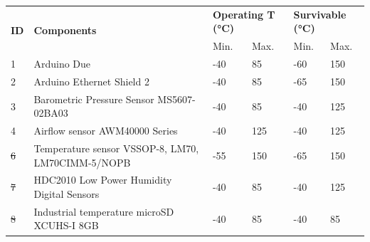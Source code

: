 \documentclass[a4paper,12pt,twoside]{article}
\providecommand{\DIFaddtex}[1]{{\protect\color{blue}\uwave{#1}}} %
\providecommand{\DIFdeltex}[1]{{\protect\color{red}\sout{#1}}}                      %
\providecommand{\DIFaddbegin}{} %
\providecommand{\DIFaddend}{} %
\providecommand{\DIFdelbegin}{} %
\providecommand{\DIFdelend}{} %
\providecommand{\DIFadd}[1]{\texorpdfstring{\DIFaddtex{#1}}{#1}} %
\providecommand{\DIFdel}[1]{\texorpdfstring{\DIFdeltex{#1}}{}} %
\newcommand{\DIFscaledelfig}{0.5}
\newlength{\DIFdelgraphicswidth} %
\newlength{\DIFdelgraphicsheight} %
\newcommand{\DIFaddincludegraphics}[2][]{{\color{blue}\fbox{\DIFOincludegraphics[#1]{#2}}}} %
\newcommand{\DIFdelincludegraphics}[2][]{%
\sbox{\DIFdelgraphicsbox}{\DIFOincludegraphics[#1]{#2}}%
\settoboxwidth{\DIFdelgraphicswidth}{\DIFdelgraphicsbox} %
\settoboxtotalheight{\DIFdelgraphicsheight}{\DIFdelgraphicsbox} %
\scalebox{\DIFscaledelfig}{%
\parbox[b]{\DIFdelgraphicswidth}{\usebox{\DIFdelgraphicsbox}\\[-\baselineskip] \rule{\DIFdelgraphicswidth}{0em}}\llap{\resizebox{\DIFdelgraphicswidth}{\DIFdelgraphicsheight}{%
\setlength{\unitlength}{\DIFdelgraphicswidth}%
\begin{picture}(1,1)%
\thicklines\linethickness{2pt} %
{\color[rgb]{1,0,0}\put(0,0){\framebox(1,1){}}}%
{\color[rgb]{1,0,0}\put(0,0){\line( 1,1){1}}}%
{\color[rgb]{1,0,0}\put(0,1){\line(1,-1){1}}}%
\end{picture}%
}\hspace*{3pt}}} %
} %
\DeclareRobustCommand{\DIFaddbegin}{\DIFOaddbegin \let\includegraphics\DIFaddincludegraphics} %
\DeclareRobustCommand{\DIFaddend}{\DIFOaddend \let\includegraphics\DIFOincludegraphics} %
\DeclareRobustCommand{\DIFdelbegin}{\DIFOdelbegin \let\includegraphics\DIFdelincludegraphics} %
\DeclareRobustCommand{\DIFdelend}{\DIFOaddend \let\includegraphics\DIFOincludegraphics} %
\begin{document}
\begin{longtable}{|m{1cm}|m{3.5cm}|m{1cm}|m{1cm}|m{1cm}|m{1cm}|}
\hline
\multirow{2}{*}{\textbf{ID}} & \multirow{2}{*}{\textbf{Components}}                                 & \multicolumn{2}{l|}{\textbf{Operating T (°C)}} & \multicolumn{2}{l|}{\textbf{Survivable (°C)}} \\ \cline{3-6} 
                             &                                                                      & Min.                   & Max.                  & Min.                  & Max.                  \\ \hline
1                            & Arduino Due                                                          & -40                    & 85                    & -60                   & 150                   \\ \hline
2                            & Arduino Ethernet Shield 2                                            & -40                    & 85                    & -65                   & 150                   \\ \hline
3                            & Barometric Pressure Sensor MS5607-02BA03                             & -40                    & 85                    & -40                   & 125                   \\ \hline
4                            & Airflow sensor AWM40000 Series                                       & -40                    & 125                   & -40                   & 125                   \\ \hline
\DIFdelbegin \DIFdel{6                            }\DIFdelend \DIFaddbegin \DIFadd{5                            }\DIFaddend & Temperature sensor VSSOP-8, LM70, LM70CIMM-5/NOPB & -55                    & 150                   & -65                   & 150                   \\ \hline
\DIFdelbegin \DIFdel{7                            }\DIFdelend \DIFaddbegin \DIFadd{6                           }\DIFaddend & HDC2010 Low Power Humidity Digital Sensors                           & -40                    & 85                    & -40                   & 125                   \\ \hline
\DIFdelbegin \DIFdel{8                            }\DIFdelend \DIFaddbegin \DIFadd{7                            }\DIFaddend & Industrial temperature microSD XCUHS-I 8GB                           & -40                    & 85                    & -40                   & 85                    \\ \hline

\end{longtable}
\end{document}
